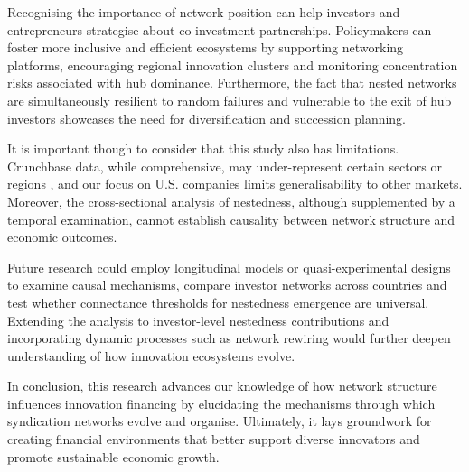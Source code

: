Recognising the importance of network position can help investors and entrepreneurs strategise about co-investment partnerships. Policymakers can foster more inclusive and efficient ecosystems by supporting networking platforms, encouraging regional innovation clusters and monitoring concentration risks associated with hub dominance. Furthermore, the fact that nested networks are simultaneously resilient to random failures and vulnerable to the exit of hub investors showcases the need for diversification and succession planning.

It is important though to consider that this study also has limitations. Crunchbase data, while comprehensive, may under-represent certain sectors or regions \cite{OECD2017}, and our focus on U.S. companies limits generalisability to other markets. Moreover, the cross-sectional analysis of nestedness, although supplemented by a temporal examination, cannot establish causality between network structure and economic outcomes. 

Future research could employ longitudinal models or quasi-experimental designs to examine causal mechanisms, compare investor networks across countries and test whether connectance thresholds for nestedness emergence are universal. Extending the analysis to investor-level nestedness contributions and incorporating dynamic processes such as network rewiring would further deepen understanding of how innovation ecosystems evolve.

In conclusion, this research advances our knowledge of how network structure influences innovation financing by elucidating the mechanisms through which syndication networks evolve and organise. Ultimately, it lays groundwork for creating financial environments that better support diverse innovators and promote sustainable economic growth.

\pagebreak